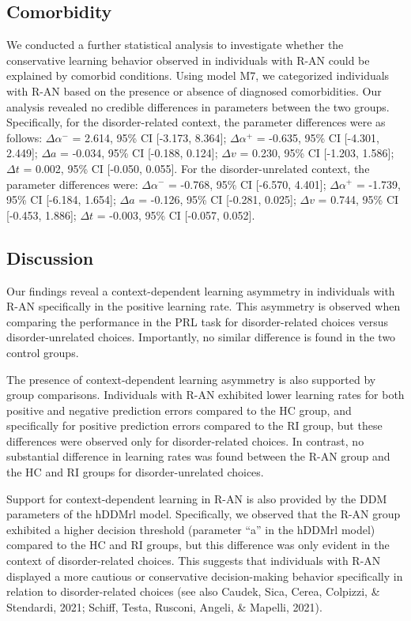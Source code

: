 \documentclass[
  man,floatsintext]{apa6}
\begin{document}
\hypertarget{comorbidity}{%
\subsection{Comorbidity}\label{comorbidity}}

We conducted a further statistical analysis to investigate whether the conservative learning behavior observed in individuals with R-AN could be explained by comorbid conditions. Using model M7, we categorized individuals with R-AN based on the presence or absence of diagnosed comorbidities. Our analysis revealed no credible differences in parameters between the two groups. Specifically, for the disorder-related context, the parameter differences were as follows: \(\Delta \alpha^-\) = 2.614, 95\% CI {[}-3.173, 8.364{]}; \(\Delta \alpha^+\) = -0.635, 95\% CI {[}-4.301, 2.449{]}; \(\Delta a\) = -0.034, 95\% CI {[}-0.188, 0.124{]}; \(\Delta v\) = 0.230, 95\% CI {[}-1.203, 1.586{]}; \(\Delta t\) = 0.002, 95\% CI {[}-0.050, 0.055{]}. For the disorder-unrelated context, the parameter differences were: \(\Delta \alpha^-\) = -0.768, 95\% CI {[}-6.570, 4.401{]}; \(\Delta \alpha^+\) = -1.739, 95\% CI {[}-6.184, 1.654{]}; \(\Delta a\) = -0.126, 95\% CI {[}-0.281, 0.025{]}; \(\Delta v\) = 0.744, 95\% CI {[}-0.453, 1.886{]}; \(\Delta t\) = -0.003, 95\% CI {[}-0.057, 0.052{]}.

\hypertarget{discussion}{%
\subsection{Discussion}\label{discussion}}

Our findings reveal a context-dependent learning asymmetry in individuals with R-AN specifically in the positive learning rate. This asymmetry is observed when comparing the performance in the PRL task for disorder-related choices versus disorder-unrelated choices. Importantly, no similar difference is found in the two control groups.

The presence of context-dependent learning asymmetry is also supported by group comparisons. Individuals with R-AN exhibited lower learning rates for both positive and negative prediction errors compared to the HC group, and specifically for positive prediction errors compared to the RI group, but these differences were observed only for disorder-related choices. In contrast, no substantial difference in learning rates was found between the R-AN group and the HC and RI groups for disorder-unrelated choices.

Support for context-dependent learning in R-AN is also provided by the DDM parameters of the hDDMrl model. Specifically, we observed that the R-AN group exhibited a higher decision threshold (parameter ``a'' in the hDDMrl model) compared to the HC and RI groups, but this difference was only evident in the context of disorder-related choices. This suggests that individuals with R-AN displayed a more cautious or conservative decision-making behavior specifically in relation to disorder-related choices (see also Caudek, Sica, Cerea, Colpizzi, \& Stendardi, 2021; Schiff, Testa, Rusconi, Angeli, \& Mapelli, 2021).
\end{document}
